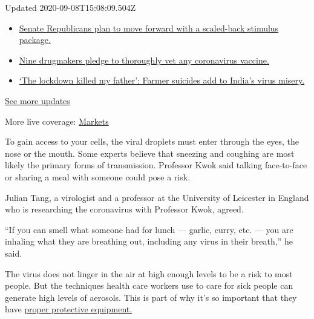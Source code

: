 Updated 2020-09-08T15:08:09.504Z

\begin{itemize}
\tightlist
\item
  \href{https://www.nytimes3xbfgragh.onion/2020/09/08/world/covid-19-coronavirus.html?action=click\&pgtype=Article\&state=default\&region=MAIN_CONTENT_1\&context=storylines_live_updates\#link-547feae1}{Senate
  Republicans plan to move forward with a scaled-back stimulus package.}
\item
  \href{https://www.nytimes3xbfgragh.onion/2020/09/08/world/covid-19-coronavirus.html?action=click\&pgtype=Article\&state=default\&region=MAIN_CONTENT_1\&context=storylines_live_updates\#link-679303d7}{Nine
  drugmakers pledge to thoroughly vet any coronavirus vaccine.}
\item
  \href{https://www.nytimes3xbfgragh.onion/2020/09/08/world/covid-19-coronavirus.html?action=click\&pgtype=Article\&state=default\&region=MAIN_CONTENT_1\&context=storylines_live_updates\#link-1c973131}{`The
  lockdown killed my father': Farmer suicides add to India's virus
  misery.}
\end{itemize}

\href{https://www.nytimes3xbfgragh.onion/2020/09/08/world/covid-19-coronavirus.html?action=click\&pgtype=Article\&state=default\&region=MAIN_CONTENT_1\&context=storylines_live_updates}{See
more updates}

More live coverage:
\href{https://www.nytimes3xbfgragh.onion/live/2020/09/08/business/stock-market-today-coronavirus?action=click\&pgtype=Article\&state=default\&region=MAIN_CONTENT_1\&context=storylines_live_updates}{Markets}

To gain access to your cells, the viral droplets must enter through the
eyes, the nose or the mouth. Some experts believe that sneezing and
coughing are most likely the primary forms of transmission. Professor
Kwok said talking face-to-face or sharing a meal with someone could pose
a risk.

Julian Tang, a virologist and a professor at the University of Leicester
in England who is researching the coronavirus with Professor Kwok,
agreed.

``If you can smell what someone had for lunch --- garlic, curry, etc.
--- you are inhaling what they are breathing out, including any virus in
their breath,'' he said.

The virus does not linger in the air at high enough levels to be a risk
to most people. But the techniques health care workers use to care for
sick people can generate high levels of aerosols. This is part of why
it's so important that they have
\href{https://www.nytimes3xbfgragh.onion/interactive/2020/03/11/us/virus-health-workers.html}{proper
protective equipment.}

